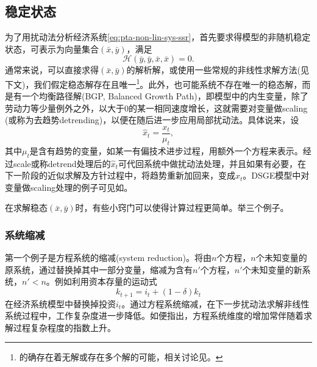 \subsection{稳定状态}
\label{sec:pta-non-lin-sys-steady-state}
为了用扰动法分析经济系统\eqref{eq:pta-non-lin-sys-ssr}，首先要求得模型的非随机稳定状态，可表示为向量集合$(\bar{x}, \bar{y})$，满足
\begin{equation}
  \label{eq:pta-non-lin-sys-ssr-ss}
  \mathcal{H} (\bar{y}, \bar{y}, \bar{x}, \bar{x}) = 0.
\end{equation}
通常来说，可以直接求得$(\bar{x}, \bar{y})$的解析解，或使用一些常规的非线性求解方法(见下文)，我们假定稳态解存在且唯一\footnote{的确存在着无解或存在多个解的可能，相关讨论见\cite{Galor:2007uw}。}。此外，也可能系统不存在唯一的稳态解，而是有一个均衡路径解(BGP, Balanced Growth Path)，即模型中的内生变量，除了劳动力等少量例外之外，以大于$0$的某一相同速度增长，这就需要对变量做scaling (或称为去趋势detrending)，以便在随后进一步应用局部扰动法。具体说来，设
\begin{equation*}
  \hat{x}_t = \frac{x_t}{\mu_t},
\end{equation*}
其中$\mu_t$是含有趋势的变量，如某一有偏技术进步过程，用额外一个方程来表示。经过scale或称detrend处理后的$\hat{x}_t$可代回系统中做扰动法处理，并且如果有必要，在下一阶段的近似求解及方针过程中，将趋势重新加回来，变成$x_t$。DSGE模型中对变量做scaling处理的例子可见如\cite{FernandezVillaverde:2007ta, Christiano:2010wla}。

在求解稳态$(\bar{x}, \bar{y})$时，有些小窍门可以使得计算过程更简单。举三个例子。
\subsubsection{系统缩减}
 \label{sec:ptb-tricks-ss-reduction}
第一个例子是方程系统的缩减(system reduction)。将由$n$个方程，$n$个未知变量的原系统，通过替换掉其中一部分变量，缩减为含有$n'$个方程，$n'$个未知变量的新系统，$n' <n$。例如\cite{Christiano:2005ib}利用资本存量的运动式
\begin{equation*}
k_{t+1} = i_t + \left(1 - \delta \right) k_t
\end{equation*}
在经济系统模型中替换掉投资$i_t$。通过方程系统缩减，在下一步扰动法求解非线性系统过程中，工作复杂度进一步降低。如\cite{Sikorski:1985ew}便指出，方程系统维度的增加常伴随着求解过程复杂程度的指数上升。

